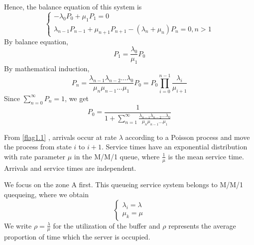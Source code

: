 \documentclass{mcmthesis}
\begin{document}
			Hence, the balance equation of this system is 
				\begin{equation}    
					\left  \{
       						\begin{array}{lr}
        						   - \lambda _0 P_0 + \mu _1 P_1 = 0\\
        						   \lambda _{n-1} P_{n-1} + \mu _{n+1} P_{n+1} -(\lambda _n + \mu _n ) P_n = 0,n>1
  					      \end{array}
					\right.
				\end{equation}
			By balance equation, 
			$${P_1 = \frac{\lambda _0}{ \mu _1}P_0 }$$
			By mathematical induction,
				\begin{equation}
					P_n = \frac {\lambda _{n-1} \lambda _{n-2} \dots \lambda_0}{\mu _n \mu_{n-1} \dots \mu _1}P_0 = P_0\prod_{i=0}^{n-1} \frac{\lambda _i}{\mu _{i+1}}
				\end{equation}
			Since ${\sum\limits_{n=0}^{ \infty } P_n = 1}$, we get
				\begin{equation}
					P_0 = \frac{1}{1 + \sum\limits_{n=1}^{ \infty} \frac {\lambda _{n-1} \lambda _{n-2} \dots \lambda_0}{\mu _n \mu_{n-1} \dots \mu _1}}
				\end{equation}
				
			From \ref{flag1.1} , arrivals occur at rate ${\lambda}$ according to a Poisson process and move the process from state ${i}$ to ${i + 1}$. Service times have an exponential distribution with rate parameter ${\mu}$ in the M/M/1 queue, where ${\frac{1}{\mu}}$ is the mean service time. Arrivals and service times are independent.
			
			We focus on the zone A first. This queueing service system belongs to M/M/1 quequeing, where we obtain
				\begin{equation}    
					\left  \{
       						\begin{array}{lr}
        						  \lambda_i = \lambda\\
        						  \mu_k = \mu
  					      \end{array}
					\right.
				\end{equation}
			We write ${\rho = \frac{\lambda}{\mu}}$ for the utilization of the buffer and  ${\rho}$ represents the average proportion of time which the server is occupied.
			
\end{document}
